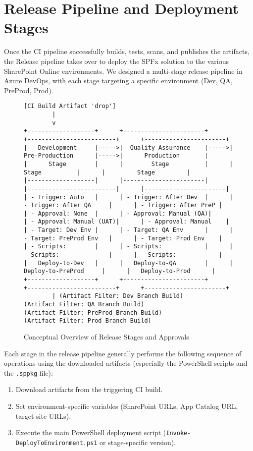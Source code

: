 \chapter{Release Pipeline and Deployment Stages}
\label{chapter:ReleasePipeline}

Once the CI pipeline successfully builds, tests, scans, and publishes the artifacts, the Release pipeline takes over to deploy the SPFx solution to the various SharePoint Online environments. We designed a multi-stage release pipeline in Azure DevOps, with each stage targeting a specific environment (Dev, QA, PreProd, Prod).

\begin{figure}[htbp]
    \centering
    \begin{verbatim}
[CI Build Artifact 'drop']
        |
        v
+-------------------+      +-----------------------+      +-------------------------+      +-----------------------+
|   Development     |----->|  Quality Assurance    |----->|     Pre-Production      |----->|      Production       |
|      Stage        |      |        Stage          |      |          Stage          |      |         Stage         |
|-------------------|      |-----------------------|      |-------------------------|      |-----------------------|
| - Trigger: Auto   |      | - Trigger: After Dev  |      | - Trigger: After QA     |      | - Trigger: After PreP |
| - Approval: None  |      | - Approval: Manual (QA)|      | - Approval: Manual (UAT)|      | - Approval: Manual    |
| - Target: Dev Env |      | - Target: QA Env      |      | - Target: PreProd Env   |      | - Target: Prod Env    |
| - Scripts:        |      | - Scripts:            |      | - Scripts:              |      | - Scripts:            |
|   Deploy-to-Dev   |      |   Deploy-to-QA        |      |   Deploy-to-PreProd     |      |   Deploy-to-Prod      |
+-------------------+      +-----------------------+      +-------------------------+      +-----------------------+
        | (Artifact Filter: Dev Branch Build)                  (Artifact Filter: QA Branch Build)                  (Artifact Filter: PreProd Branch Build)                 (Artifact Filter: Prod Branch Build)
    \end{verbatim}
    \caption{Conceptual Overview of Release Stages and Approvals}
    \label{fig:ReleaseStagesApprovals}
\end{figure}

Each stage in the release pipeline generally performs the following sequence of operations using the downloaded artifacts (especially the PowerShell scripts and the \texttt{.sppkg} file):
\begin{enumerate}
    \item Download artifacts from the triggering CI build.
    \item Set environment-specific variables (SharePoint URLs, App Catalog URL, target site URLs).
    \item Execute the main PowerShell deployment script (\texttt{Invoke-DeployToEnvironment.ps1} or stage-specific version).
\end{enumerate}

